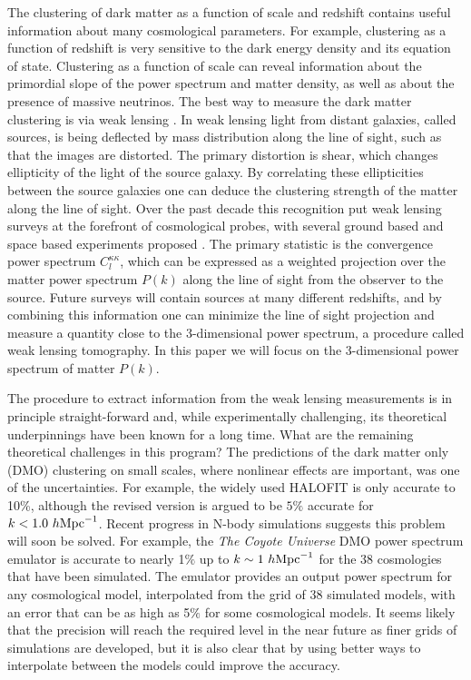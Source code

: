 \documentclass[
  11pt,
  twoside,
  openright,
  titlepage,
  headings=optiontoheadandtoc
]{scrbook}
\begin{document}
The clustering of dark matter as a function of scale and redshift
contains useful information about many cosmological parameters. 
For example, clustering as a function of redshift is very sensitive to the 
dark energy density and its equation of state.
Clustering as a function of scale can reveal information about the primordial slope of the power spectrum and
matter density, as well as about the presence of massive neutrinos. 
The best way to measure the dark matter clustering is via weak lensing \citep{2001PhR...340..291B,2003ARA&A..41..645R}. 
In weak lensing light from distant galaxies, called sources, is being deflected by mass distribution along the 
line of sight, such as that the images are distorted. The primary distortion is shear, which changes ellipticity 
of the light of the source galaxy. By correlating these ellipticities between the source galaxies one can deduce 
the clustering strength of the matter along the line of sight. 
Over the past decade 
this recognition put weak lensing surveys at the forefront of cosmological probes, with several 
ground based and space based experiments proposed \citep{2006ApJ...647..116H,2007MNRAS.376...13M, 2008A&A...479....9F, 2010A&A...516A..63S}. 
The primary statistic is the convergence power spectrum $C_l^{\kappa \kappa}$, which can be expressed as a weighted 
projection over the matter power spectrum $P(k)$ along the line of sight from the observer to the source. 
Future surveys will contain sources at many different redshifts, and by combining this information one 
can minimize the line of sight projection and measure a quantity close to the 3-dimensional 
power spectrum, a procedure called weak lensing tomography. In this paper we will focus on 
the 3-dimensional power spectrum of matter $P(k)$. 

The procedure to extract information from the weak lensing measurements 
is in principle straight-forward and, while experimentally challenging, its theoretical 
underpinnings have been known for a long time. 
What are the remaining theoretical challenges in this program? The predictions of the 
dark matter only (DMO)  clustering on small scales, where nonlinear effects are important, was one of the 
uncertainties. For example, 
the widely used HALOFIT \citep{2003MNRAS.341.1311S} is only accurate to 10\%, although
the revised version \citep{2012ApJ...761..152T} is argued to be $5\%$ accurate for $k < 1.0\ h \rm{Mpc}^{-1}$. 
Recent progress in N-body simulations suggests this problem will soon be solved.  
For example, the \textit{The Coyote Universe} DMO power spectrum 
emulator \citep{2010ApJ...715..104H,2009ApJ...705..156H,2010ApJ...713.1322L} is accurate to nearly 1$\%$ up to $k\sim 1\ h \rm{Mpc}^{-1}$ for the 38 cosmologies that have been simulated. The emulator provides an output power spectrum for 
any cosmological model, interpolated from the grid of 38 simulated models, 
with an error that can be as high as 5$\%$ for some cosmological models. 
It seems likely that the precision will reach the required level in the near future as finer grids of simulations 
are developed, but it is also clear that by using better ways to interpolate between the models could 
improve the accuracy. 
\end{document}
